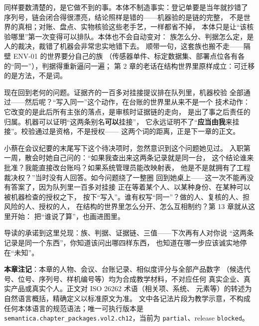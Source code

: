 同样要数清楚的，是它做不到的事。本体不制造事实：登记单要是当年就抄错了
序列号，链会闭合得很漂亮，结论照样是错的——机器验的是链的完整，
不是世界的真相；对账、盘点、实物核验这些老手艺，一样都省不掉，
本体只是让“该核验哪里”第一次变得可以排队。本体也不会自动变对：
族怎么分、判据怎么定，是人的裁决，裁错了机器会非常忠实地错下去。
顺带一句，这套族也搬不走——隔壁 ENV-01 的世界要分自己的族
（传感器单件、标定数据集、部署点位各有各的“同一”），判据得重新逼问一遍；
第 2 章的老话在结构世界里原样成立：可迁移的是方法，不是词。

现在回到老何的问题。证据齐的一百多对挂接提议排在队列里，机器校验
全部通过——然后呢？“写入同一”这个动作，在台账的世界里从来不是一个
技术动作：它改变的是此后所有主张的落点，是审核时证据链的走向，
是出了事之后责任的归属。机器可以证明“这两条别名\textbf{可以}挂接”，
它永远证明不了“\textbf{应当由我}来挂接”。校验通过是资格，不是授权——
这两个词的距离，正是下一章的正文。

小蔡在会议纪要的末尾写下这个待决项时，忽然意识到这个问题她见过。
入职第一周，散会时她自己问的：“如果我查出来这两条记录就是同一台，
这个结论谁来批准？我能直接改台账吗？如果系统管理员能改映射表，
他是不是就拥有了工程裁决权？”当时没有人回答。如今问题绕了一整圈
回到她桌上——这一次不能再没有答案了，因为队列里一百多对挂接
正在等着某个人、以某种身份、在某种可以被机器检查的授权之下，
按下“写入”。谁有权写“同一”？做的人、复核的人、担风险的人、授权的人，
在结构的世界里怎么分开、怎么互相制约？第 13 章就从这里开始：
把“谁说了算”，也画进图里。

导读的承诺到这里兑现：族、判据、证据链、三值——下次再有人对你说
“这两条记录是同一个东西”，你知道该问出哪四样东西，
也知道在哪一步应该诚实地停在“未知”。


\begin{noteblock}
\textbf{本章注记}：本章的人物、会议、台账记录、相似度评分与全部产品数字
（候选代号、位号、序列号、样机编号等）均为合成教学材料，不对应任何
真实企业、真实产品或真实个人。正文对 ISO 26262 术语（相关项、系统、
元素等）的转述为自然语言概括，精确定义以标准原文为准。
文中各记法片段为教学示意，不构成任何本体语言的规范语法；唯一可执行版本是
\nolinkurl{semantica.chapter_packages.vol2.ch12}，当前为 \nolinkurl{partial}、release \nolinkurl{blocked}。
\end{noteblock}
